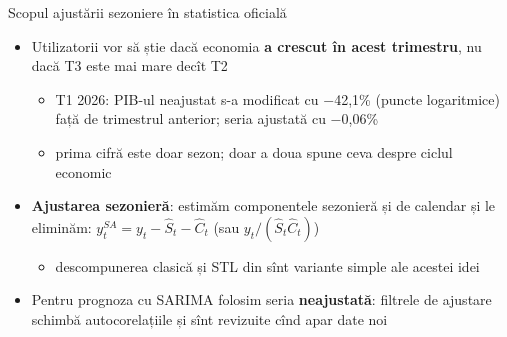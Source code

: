 \begin{frame}{Scopul ajustării sezoniere în statistica oficială}
\itemsize{\small}
\begin{itemize}
    \item Utilizatorii vor să știe dacă economia \textbf{a crescut în acest trimestru}, nu dacă T3 este mai mare decît T2
    \begin{itemize}
        \item T1 2026: PIB-ul neajustat s-a modificat cu \ensuremath{-}42{,}1\% (puncte logaritmice) față de trimestrul anterior; seria ajustată cu \ensuremath{-}0{,}06\%
        \item prima cifră este doar sezon; doar a doua spune ceva despre ciclul economic
    \end{itemize}
    \item \textbf{Ajustarea sezonieră}: estimăm componentele sezonieră și de calendar și le eliminăm: $y_t^{SA} = y_t - \hat S_t - \hat C_t$ (sau $y_t/(\hat S_t\hat C_t)$)
    \begin{itemize}
        \item descompunerea clasică și STL din  sînt variante simple ale acestei idei
    \end{itemize}
    \item Pentru prognoza cu SARIMA folosim seria \textbf{neajustată}: filtrele de ajustare schimbă autocorelațiile și sînt revizuite cînd apar date noi
\end{itemize}
\end{frame}

